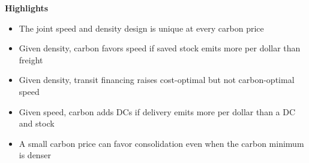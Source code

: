 \documentclass[11pt]{article}
\begin{document}
\textbf{Highlights}

\begin{itemize}
\item The joint speed and density design is unique at every carbon price
\item Given density, carbon favors speed if saved stock emits more per dollar than freight
\item Given density, transit financing raises cost-optimal but not carbon-optimal speed
\item Given speed, carbon adds DCs if delivery emits more per dollar than a DC and stock
\item A small carbon price can favor consolidation even when the carbon minimum is denser
\end{itemize}
\end{document}
